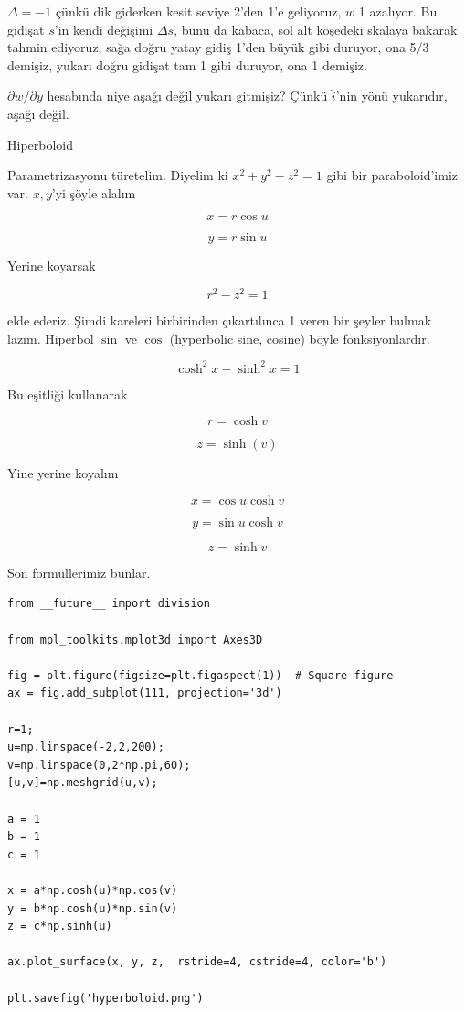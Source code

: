 \documentclass[12pt,fleqn]{article}\usepackage{../../common}
\begin{document}
$\Delta = -1$ çünkü dik giderken kesit seviye 2'den 1'e geliyoruz, $w$ 1
azalıyor. Bu gidişat $s$'in kendi değişimi $\Delta s$, bunu da kabaca, sol alt
köşedeki skalaya bakarak tahmin ediyoruz, sağa doğru yatay gidiş 1'den büyük
gibi duruyor, ona 5/3 demişiz, yukarı doğru gidişat tam 1 gibi duruyor, ona 1
demişiz.

$\partial w / \partial y$ hesabında niye aşağı değil yukarı gitmişiz? Çünkü
$\hat{i}$'nin yönü yukarıdır, aşağı değil. 

Hiperboloid 

Parametrizasyonu türetelim. Diyelim ki $x^2 + y^2 - z^2 = 1$ gibi bir
paraboloid'imiz var. $x,y$'yi şöyle alalım

$$ x = r \cos u $$

$$ y = r \sin u $$

Yerine koyarsak

$$ r^2 - z^2 = 1 $$

elde ederiz. Şimdi kareleri birbirinden çıkartılınca 1 veren bir şeyler
bulmak lazım. Hiperbol $\sin$ ve $\cos$ (hyperbolic sine, cosine) böyle
fonksiyonlardır. 

$$ \cosh^2x - \sinh^2x = 1 $$

Bu eşitliği kullanarak 

$$ r = \cosh v $$

$$ z = \sinh(v) $$

Yine yerine koyalım

$$ x = \cos u \cosh v $$

$$ y = \sin u \cosh v $$

$$ z = \sinh v $$

Son formüllerimiz bunlar.

\begin{verbatim}
from __future__ import division

from mpl_toolkits.mplot3d import Axes3D

fig = plt.figure(figsize=plt.figaspect(1))  # Square figure
ax = fig.add_subplot(111, projection='3d')

r=1;
u=np.linspace(-2,2,200);
v=np.linspace(0,2*np.pi,60);
[u,v]=np.meshgrid(u,v);

a = 1
b = 1
c = 1

x = a*np.cosh(u)*np.cos(v)
y = b*np.cosh(u)*np.sin(v)
z = c*np.sinh(u)

ax.plot_surface(x, y, z,  rstride=4, cstride=4, color='b')

plt.savefig('hyperboloid.png')
\end{verbatim}
\end{document}
